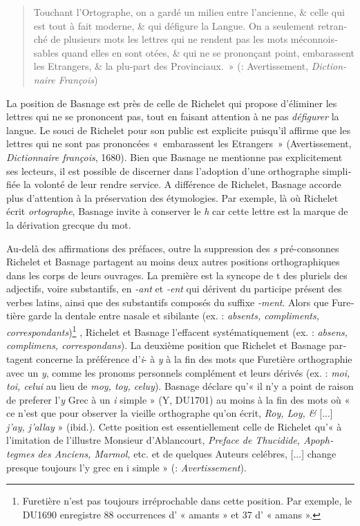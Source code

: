 \documentclass[output=paper,colorlinks,citecolor=brown,arabicfont,chinesefont,booklanguage=french]{langscibook}
\begin{document}
\begin{otherlanguage}{french}
\begin{quote}
    Touchant l'Ortographe, on a gardé un milieu entre l'ancienne, \& celle qui est tout à fait moderne, \& qui défigure la Langue. On a seulement retranché de plusieurs mots les lettres qui ne rendent pas les mots méconnoissables quand elles en sont otées, \& qui ne se prononçant point, embarassent les Etrangers, \& la plu-part des Provinciaux.~» (\citealt{Richelet1680}:  Avertissement, \emph{Dictionnaire François})
\end{quote}

La position de Basnage est près de celle de Richelet qui propose d'éliminer les lettres qui ne se prononcent pas, tout en faisant attention à ne pas \emph{défigurer} la langue. Le souci de Richelet pour son public est explicite puisqu'il affirme que les lettres qui ne sont pas prononcées «~embarassent les Etrangers~» (Avertissement, \emph{Dictionnaire françois}, 1680). Bien que Basnage ne mentionne pas explicitement ses lecteurs, il est possible de discerner dans l'adoption d'une orthographe simplifiée la volonté de leur rendre service. A différence de Richelet, Basnage accorde plus d'attention à la préservation des étymologies. Par exemple, là où Richelet écrit \emph{ortographe}, Basnage invite à conserver le \emph{h} car cette lettre est la marque de la dérivation grecque du mot. 

Au-delà des affirmations des préfaces, outre la suppression des \emph{s} pré-consonnes Richelet et Basnage partagent au moins deux autres positions orthographiques dans les corps de leurs ouvrages. La première est la syncope de t des pluriels des adjectifs, voire substantifs, en \emph{-ant} et \emph{-ent} qui dérivent du participe présent des verbes latins, ainsi que des substantifs composés du suffixe \textit{-ment}. Alors que Furetière garde la dentale entre nasale et sibilante (ex. : \emph{absents, compliments, correspondants})\footnote{Furetière n'est pas toujours irréprochable dans cette position. Par exemple, le DU1690 enregistre 88 occurrences d' « amants » et 37 d' « amans ».} , Richelet et Basnage l'effacent systématiquement (ex. : \emph{absens, complimens, correspondans}). La deuxième position que Richelet et Basnage partagent concerne la préférence d’\emph{i}- à \emph{y} à la fin des mots que Furetière orthographie avec un \emph{y}, comme les pronoms personnels complément et leurs dérivés (ex. : \emph{moi, toi, celui} au lieu de \emph{moy, toy, celuy}). Basnage déclare qu’« il n’y a point de raison de preferer l'\emph{y} Grec à un \emph{i} simple » (Y, DU1701) au moins à la fin des mots où « ce n’est que pour observer la vieille orthographe qu’on écrit, \emph{Roy, Loy, \& }[...] \emph{j’ay, j’allay} » (ibid.). Cette position est essentiellement celle de Richelet qu’« à l’imitation de l’illustre Monsieur d’Ablancourt, \emph{Preface de Thucidide, Apophtegmes des Anciens, Marmol,} etc. et de quelques Auteurs celébres, [...] change presque toujours l’y grec en i simple » (\citealt{Richelet1680}:  \emph{Avertissement}).


\end{otherlanguage}
\end{document}
